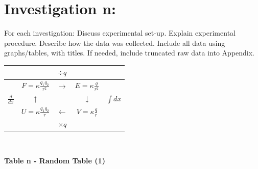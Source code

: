 \documentclass[12pt]{article}
\begin{document}
	\section*{Investigation n:}
		\begin{outline}[enumerate]
			\1 For each investigation: Discuss experimental set-up.
			\1 Explain experimental procedure.
			\1 Describe how the data was collected.
			\1 Include all data using graphs/tables, with titles.
				\2 If needed, include truncated raw data into Appendix.
				
		\begin{center}
			\begin{tabular}{c|ccc|c}
        			&            
        			& $\div q$    
         		&              
         		&        \\ \hline
         		& $ F = \kappa \frac{q_1 q_2}{r^2}$    
         		& $\rightarrow$ 
         		& $E = \kappa \frac{q}{r^2}$       
         		&        \\ $ \frac{d}{dx} $ 
         		& $\uparrow$ 
         		&               
         		& $\downarrow$ 
         		& $ \int dx$ \\
         		& $ U = \kappa \frac{q_1 q_2}{r}$    
         		& $\leftarrow$  
         		& $ V = \kappa \frac{q}{r}$      
         		&        \\ \hline
         		&            
         		& $ \times q $         
         		&              
         		&       
			\end{tabular}\\
			\begin{small} \textbf{
				Table n - Random Table (1)
			} \end{small}
		\end{center}
		

\end{outline}
\end{document}
